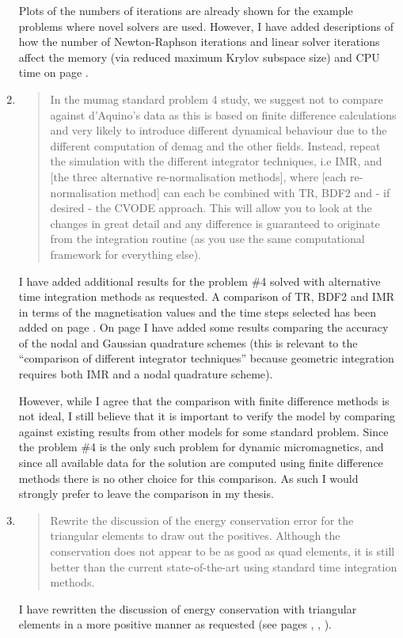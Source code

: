 \documentclass[12pt,a4paper,pdftex]{article}
\begin{document}
\begin{enumerate}
  Plots of the numbers of iterations are already shown for the example problems where novel solvers are used.
However, I have added descriptions of how the number of Newton-Raphson iterations and linear solver iterations affect the memory (via reduced maximum Krylov subspace size) and CPU time on page \pageref{mem-cpu-solver-correction}.

\item
  \begin{quotation}
    In the mumag standard problem 4 study, we suggest not to compare
    against d'Aquino's data as this is based on finite difference
    calculations and very likely to introduce different dynamical behaviour
    due to the different computation of demag and the other fields.
    Instead, repeat the simulation with the different integrator
    techniques, i.e IMR, and [the three alternative re-normalisation
    methods], where [each re-normalisation method] can each be combined with
    TR, BDF2 and - if desired - the CVODE approach. This will allow you to
    look at the changes in great detail and any difference is guaranteed to
    originate from the integration routine (as you use the same
    computational framework for everything else).
  \end{quotation}
  I have added additional results for the \mumag problem \#4 solved with alternative time integration methods as requested.
  A comparison of TR, BDF2 and IMR in terms of the magnetisation values and the time steps selected has been added on page \pageref{more-mumag4-correction-1}.
  On page \pageref{more-mumag4-correction-2} I have added some results comparing the accuracy of the nodal and Gaussian quadrature schemes (this is relevant to the ``comparison of different integrator techniques'' because geometric integration requires both IMR and a nodal quadrature scheme).

  However, while I agree that the comparison with finite difference methods is not ideal, I still believe that it is important to verify the model by comparing against existing results from other models for some standard problem.
  Since the \mumag problem \#4 is the only such problem for dynamic micromagnetics, and since all available data for the solution are computed using finite difference methods there is no other choice for this comparison.
  As such I would strongly prefer to leave the comparison in my thesis.

\item
  \begin{quotation}
    Rewrite the discussion of the energy conservation error for the
    triangular elements to draw out the positives. Although the
    conservation does not appear to be as good as quad elements, it is
    still better than the current state-of-the-art using standard time
    integration methods.
  \end{quotation}
  I have rewritten the discussion of energy conservation with triangular elements in a more positive manner as requested (see pages \pageref{sec:triangular-meshes}, \pageref{sec:numer-experiments-conclusions}, \pageref{sec:future-work}).

\end{enumerate}
\end{document}
